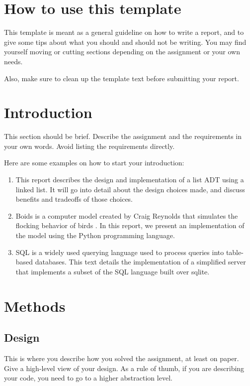 \documentclass{article}
\begin{document}
\begin{flushleft}
\setcounter{page}{1}
\section[How to use this template]{How to use this template}
This template is meant as a general guideline on how to write a report, and to give some tips about what you should and should not be writing. You may find yourself moving or cutting sections depending on the assignment or your own needs.


\bigskip

Also, make sure to clean up the template text before submitting your report. 

\section{Introduction}
This section should be brief. Describe the assignment and the requirements in your own words. Avoid listing the requirements directly.


\bigskip

Here are some examples on how to start your introduction:

\begin{enumerate}
\item This report describes the design and implementation of a list ADT using a linked list. It will go into detail about the design choices made, and discuss benefits and tradeoffs of those choices.
\item Boids is a computer model created by Craig Reynolds that simulates the flocking behavior of birds \cite{tanenbaum}. In this report, we present an implementation of the model using the Python programming language.
\item SQL is a widely used querying language used to process queries into table-based databases. This text details the implementation of a simplified server that implements a subset of the SQL language built over sqlite.
\end{enumerate}

\section{Methods}

\subsection{Design}
This is where you describe how you solved the assignment, at least on paper. Give a high-level view of your design. 
As a rule of thumb, if you are describing your code, you need to go to a higher abstraction level.



\end{flushleft}
\end{document}
